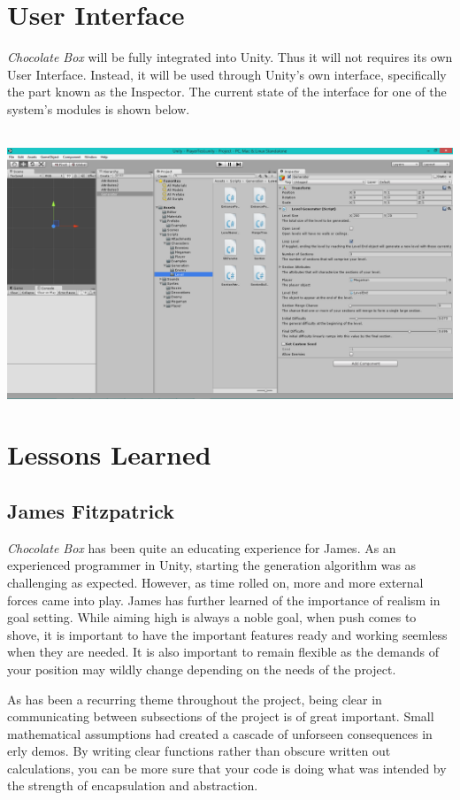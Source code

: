 \documentclass[pdftex,12pt,letter]{article}
\begin{document}
\begin{itemize}
\begin{itemize}
\begin{itemize}
\begin{itemize}
\section{User Interface}
\textit{Chocolate Box} will be fully integrated into Unity. Thus it will not requires its own User Interface. Instead, it will be used through Unity's own interface, specifically the part known as the Inspector. The current state of the interface for one of the system's modules is shown below.\\\\
\centerline{\includegraphics[width=7in]{UnitySS.png}}
\FloatBarrier
\section{Lessons Learned}
\subsection{James Fitzpatrick}
\textit{Chocolate Box} has been quite an educating experience for James. As an experienced programmer in Unity, starting the generation algorithm was as challenging as expected. However, as time rolled on, more and more external forces came into play. James has further learned of the importance of realism in goal setting. While aiming high is always a noble goal, when push comes to shove, it is important to have the important features ready and working seemless when they are needed. It is also important to remain flexible as the demands of your position may wildly change depending on the needs of the project. 

As has been a recurring theme throughout the project, being clear in communicating between subsections of the project is of great important. Small mathematical assumptions had created a cascade of unforseen consequences in erly demos. By writing clear functions rather than obscure written out calculations, you can be more sure that your code is doing what was intended by the strength of encapsulation and abstraction. 


\end{itemize}
\end{itemize}
\end{itemize}
\end{itemize}
\end{document}
